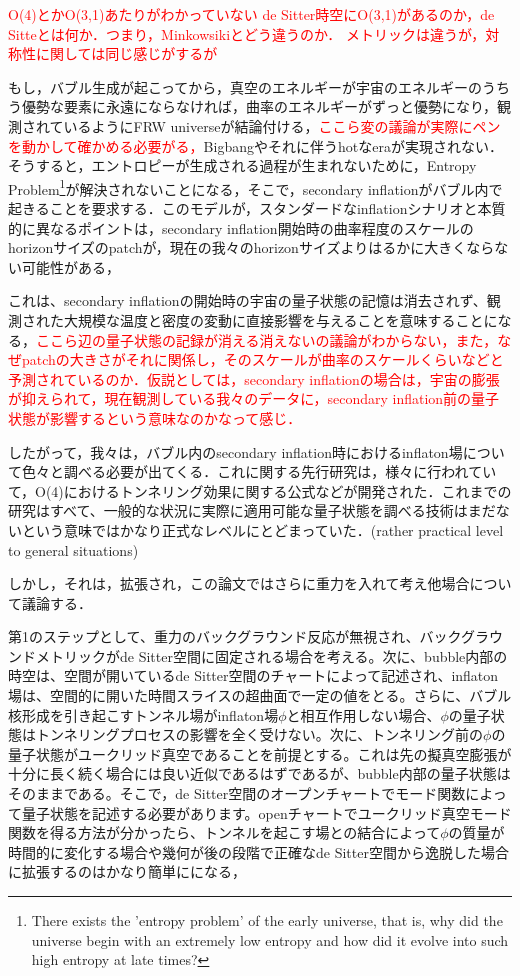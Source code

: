 \textcolor{red}{O(4)とかO(3,1)あたりがわかっていない
de Sitter時空にO(3,1)があるのか，de Sitteとは何か．つまり，Minkowsikiとどう違うのか．
メトリックは違うが，対称性に関しては同じ感じがするが}

もし，バブル生成が起こってから，真空のエネルギーが宇宙のエネルギーのうちう優勢な要素に永遠にならなければ，曲率のエネルギーがずっと優勢になり，観測されているようにFRW universeが結論付ける，\textcolor{red}{ここら変の議論が実際にペンを動かして確かめる必要がる，}Bigbangやそれに伴うhotなeraが実現されない．そうすると，エントロピーが生成される過程が生まれないために，Entropy Problem\footnote{There exists the 'entropy problem' of the early universe, that is, why did the universe begin with an extremely low entropy and how did it evolve into such high entropy at late times? }が解決されないことになる，そこで，secondary inflationがバブル内で起きることを要求する．このモデルが，スタンダードなinflationシナリオと本質的に異なるポイントは，secondary inflation開始時の曲率程度のスケールのhorizonサイズのpatchが，現在の我々のhorizonサイズよりはるかに大きくならない可能性がある，

 これは、secondary inflationの開始時の宇宙の量子状態の記憶は消去されず、観測された大規模な温度と密度の変動に直接影響を与えることを意味することになる，\textcolor{red}{ここら辺の量子状態の記録が消える消えないの議論がわからない，また，なぜpatchの大きさがそれに関係し，そのスケールが曲率のスケールくらいなどと予測されているのか．仮説としては，secondary inflationの場合は，宇宙の膨張が抑えられて，現在観測している我々のデータに，secondary inflation前の量子状態が影響するという意味なのかなって感じ．}

 したがって，我々は，バブル内のsecondary inflation時におけるinflaton場について色々と調べる必要が出てくる．これに関する先行研究は，様々に行われていて，O(4)におけるトンネリング効果に関する公式などが開発された．これまでの研究はすべて、一般的な状況に実際に適用可能な量子状態を調べる技術はまだないという意味ではかなり正式なレベルにとどまっていた．(rather practical level to general situations)

しかし，それは，拡張され\cite{12}，この論文ではさらに重力を入れて考え他場合について議論する．

第1のステップとして、重力のバックグラウンド反応が無視され、バックグラウンドメトリックがde Sitter空間に固定される場合を考える。次に、bubble内部の時空は、空間が開いているde Sitter空間のチャートによって記述され、inflaton場は、空間的に開いた時間スライスの超曲面で一定の値をとる。さらに、バブル核形成を引き起こすトンネル場がinflaton場$\phi$と相互作用しない場合、$\phi$の量子状態はトンネリングプロセスの影響を全く受けない。次に、トンネリング前の$\phi$の量子状態がユークリッド真空であることを前提とする。これは先の擬真空膨張が十分に長く続く場合には良い近似であるはずであるが、bubble内部の量子状態はそのままである。そこで，de Sitter空間のオープンチャートでモード関数によって量子状態を記述する必要があります。openチャートでユークリッド真空モード関数を得る方法が分かったら、トンネルを起こす場との結合によって$\phi$の質量が時間的に変化する場合や幾何が後の段階で正確なde Sitter空間から逸脱した場合に拡張するのはかなり簡単にになる，

